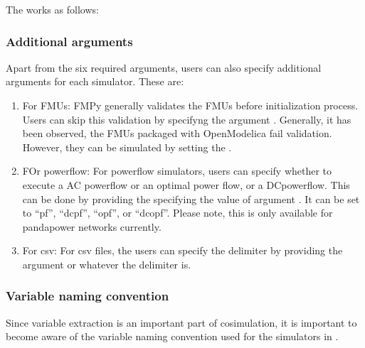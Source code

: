 \documentclass[letterpaper,10pt,english]{sphinxmanual}
\begin{document}
The  works as follows:

\begin{sphinxVerbatim}[commandchars=\\\{\}]
     
                            
                          
\end{sphinxVerbatim}


\subsubsection{Additional arguments}
\label{\detokenize{add_simulator:additional-arguments}}
Apart from the six required arguments, users can also specify additional arguments for each simulator. These are:
\begin{enumerate}
%
\item {} 
For FMUs: FMPy generally validates the FMUs before initialization process. Users can skip this validation by specifyng the argument . Generally, it has been observed, the FMUs packaged with OpenModelica fail validation. However, they can be simulated by setting the .

\item {} 
FOr powerflow: For powerflow simulators, users can specify whether to execute a AC powerflow or an optimal power flow, or a DCpowerflow. This can be done by providing the specifying the value of argument . It can be set to “pf”, “dcpf”, “opf”, or “dcopf”. Please note, this is only available for pandapower networks currently.

\item {} 
For csv: For csv files, the users can specify the delimiter by providing the argument  or whatever the delimiter is.

\end{enumerate}


\subsubsection{Variable naming convention}
\label{\detokenize{add_simulator:variable-naming-convention}}
Since variable extraction is an important part of cosimulation, it is important to become aware of the variable naming convention used for the simulators in .
\end{document}
